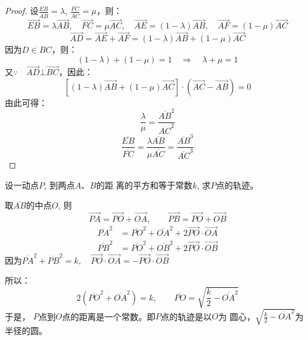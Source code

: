 \begin{proof}
设$\frac{\overline{EB}}{\overline{AB}}=\lambda$, $\frac{\overline{FC}}{\overline{AC}}=\mu$，则：  
\[\Vec{EB}=\lambda\Vec{AB},\quad \Vec{FC}=\mu\Vec{AC},\quad \Vec{AE}=(1-\lambda)\Vec{AB},\quad \Vec{AF}=(1-\mu)\Vec{AC}\]
\[\Vec{AD}=\Vec{AE}+\Vec{AF}=(1-\lambda)\Vec{AB}+(1-\mu)\Vec{AC}\]
因为$D\in BC$，则：
\[(1-\lambda)+(1-\mu)=1\quad \Rightarrow\quad \lambda+\mu=1\]
又$\because\quad \Vec{AD}\bot \Vec{BC}$，因此：
\[\left[(1-\lambda)\Vec{AB}+(1-\mu)\Vec{AC}\right]\cdot \left(\Vec{AC}-\Vec{AB}\right)=0\]
由此可得：
\[\frac{\lambda}{\mu}=\frac{\overline{AB}^2}{\overline{AC}^2}\]
\[\frac{\overline{EB}}{\overline{FC}}=\frac{\lambda\overline{AB}}{\mu\overline{AC}}=\frac{\overline{AB}^3}{\overline{AC}^3}\]
\end{proof}

\begin{figure}[htp]\centering
    \begin{minipage}[t]{0.48\textwidth}
    \centering
{}
    \caption{}
    \end{minipage}
    \begin{minipage}[t]{0.48\textwidth}
    \centering
    \caption{}
    \end{minipage}
    \end{figure}

\begin{example}
    设一动点$P$, 到两点$A$、$B$的距
离的平方和等于常数$k$, 求$P$点的轨迹。
\end{example}

\begin{solution}
    取$\overline{AB}$的中点$O$, 则
\[\Vec{PA}=\Vec{PO}+\Vec{OA},\qquad \Vec{PB}=\Vec{PO}+\Vec{OB}\]
\[\begin{split}
    \overline{PA}^2&=\overline{PO}^2+\overline{OA}^2+2\Vec{PO}\cdot\Vec{OA}\\
    \overline{PB}^2&=\overline{PO}^2+\overline{OB}^2+2\Vec{PO}\cdot \Vec{OB}
\end{split}\]
因为$\overline{PA}^2+\overline{PB}^2=k,\quad \Vec{PO}\cdot\Vec{OA}=-\Vec{PO}\cdot \Vec{OB}$

所以：
\[2\left(\overline{PO}^2+\overline{OA}^2\right)=k,\qquad \overline{PO}=\sqrt{\frac{k}{2}-\overline{OA}^2}\]
于是，
$P$点到$O$点的距离是一个常数。即$P$点的轨迹是以$O$为
圆心，$\sqrt{\frac{k}{2}-\overline{OA}^2}$为半径的圆。
\end{solution}


